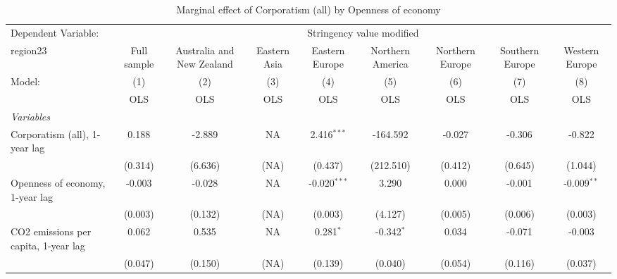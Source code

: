 
\begin{table}[htbp]
   \caption{Marginal effect of Corporatism (all) by Openness of economy}
   \centering
   \begin{tabular}{lcccccccc}
      \toprule
      Dependent Variable: & \multicolumn{8}{c}{Stringency value modified}\\
      region23                                                        & Full sample   & Australia and New Zealand & Eastern Asia & Eastern Europe & Northern America & Northern Europe & Southern Europe & Western Europe \\   
      Model:                                                          & (1)           & (2)                       & (3)          & (4)            & (5)              & (6)             & (7)             & (8)\\  
                                                                      &  OLS          & OLS                       & OLS          & OLS            & OLS              & OLS             & OLS             & OLS\\  
      \midrule
      \emph{Variables}\\
      Corporatism (all), 1-year lag                                   & 0.188         & -2.889                    & NA           & 2.416$^{***}$  & -164.592         & -0.027          & -0.306          & -0.822\\   
                                                                      & (0.314)       & (6.636)                   & (NA)         & (0.437)        & (212.510)        & (0.412)         & (0.645)         & (1.044)\\   
      Openness of economy, 1-year lag                                 & -0.003        & -0.028                    & NA           & -0.020$^{***}$ & 3.290            & 0.000           & -0.001          & -0.009$^{**}$\\   
                                                                      & (0.003)       & (0.132)                   & (NA)         & (0.003)        & (4.127)          & (0.005)         & (0.006)         & (0.003)\\   
      CO2 emissions per capita, 1-year lag                            & 0.062         & 0.535                     & NA           & 0.281$^{*}$    & -0.342$^{*}$     & 0.034           & -0.071          & -0.003\\   
                                                                      & (0.047)       & (0.150)                   & (NA)         & (0.139)        & (0.040)          & (0.054)         & (0.116)         & (0.037)\\   

\end{tabular}
\end{table}
